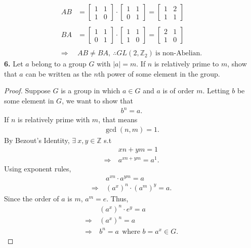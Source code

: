 \documentclass[12pt, letterpaper]{article}
\begin{document}
\begin{align*}
    AB & = \left[\begin{array}{cc} 
        1 & 1 \\
        1 &0 
    \end{array}\right] \cdot \left[\begin{array}{cc}
         1&1  \\
         0&1 
    \end{array}\right] = \left[\begin{array}{cc}
        1 & 2 \\
        1 & 1
    \end{array}\right] \\ \\
    BA &= \left[\begin{array}{cc}
         1&1  \\
         0&1 
    \end{array}\right] \cdot \left[\begin{array}{cc} 
        1 & 1 \\
        1 &0 
    \end{array}\right] = \left[\begin{array}{cc}
        2 & 1 \\
        1 & 0
    \end{array}\right] \\ \\
    \Rightarrow \ &\boxed{AB \neq BA, \ \therefore GL(2, \mathbb{Z}_{2}) \ \text{is non-Abelian.}}
\end{align*}
\vspace{0.2em}
\textbf{6.} Let $a$ belong to a group $G$ with $|a| = m$. If $n$ is relatively prime to $m$, show that $a$ can be written as the $n$th power of some element in the group.
\begin{proof}
    Suppose $G$ is a group in which $a \in G$ and $a$ is of order $m$. Letting $b$ be some element in $G$, we want to show that 
    \begin{align*}
        b^{n} = a.
    \end{align*}If $n$ is relatively prime with $m$, that means
    \begin{align*}
        \gcd(n, m) = 1.
    \end{align*}
    By Bezout's Identity, $\exists \ x,y \in \mathbb{Z}$ s.t
    \begin{align*}
        &xn + ym = 1 \\
        \Rightarrow \ &a^{xn + ym} = a^{1}.
    \end{align*}
    Using exponent rules,
    \begin{align*}
        &a^{xn} \cdot a^{ym} = a \\
        \Rightarrow \ &(a^{x})^{n} \cdot (a^{m})^{y} = a.
    \end{align*}
    Since the order of $a$ is $m$, $a^m = e$. Thus,
    \begin{align*}
        &(a^{x})^n \cdot e^{y} = a \\
        \Rightarrow \ &(a^{x})^{n} = a \\
        \Rightarrow \ &b^n = a \ \ \text{where $b = a^{x} \in G$}.
    \end{align*}
\end{proof}
\end{document}
